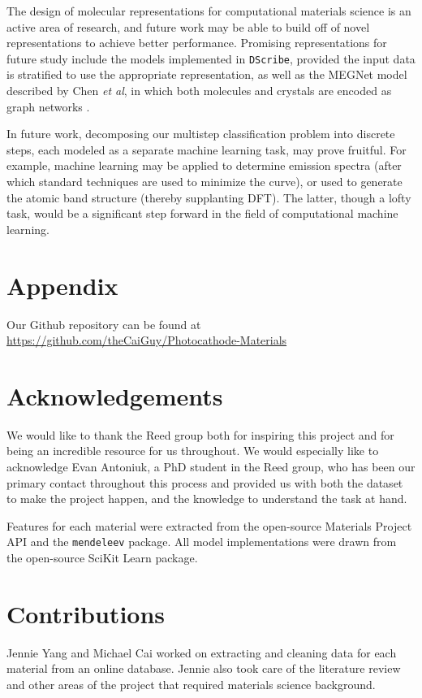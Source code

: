 \documentclass[10pt,twocolumn,letterpaper]{article}
\begin{document}
The design of molecular representations for computational materials science is an active area of research, and future work may be able to build off of novel representations to achieve better performance. Promising representations for future study include the models implemented in \texttt{DScribe}, provided the input data is stratified to use the appropriate representation, as well as the MEGNet model described by Chen \textit{et al}, in which both molecules and crystals are encoded as graph networks \cite{MEGNet}.

In future work, decomposing our multistep classification problem into discrete steps, each modeled as a separate machine learning task, may prove fruitful. For example, machine learning may be applied to determine emission spectra (after which standard techniques are used to minimize the curve), or used to generate the atomic band structure (thereby supplanting DFT). The latter, though a lofty task, would be a significant step forward in the field of computational machine learning.

\section{Appendix}

Our Github repository can be found at \url{https://github.com/theCaiGuy/Photocathode-Materials}

\section{Acknowledgements}
We would like to thank the Reed group both for inspiring this project and for being an incredible resource for us throughout. We would especially like to acknowledge Evan Antoniuk, a PhD student in the Reed group, who has been our primary contact throughout this process and provided us with both the dataset to make the project happen, and the knowledge to understand the task at hand.

Features for each material were extracted from the open-source Materials Project API and the \texttt{mendeleev} package. All model implementations were drawn from the open-source SciKit Learn package.


\section{Contributions}
Jennie Yang and Michael Cai worked on extracting and cleaning data for each material from an online database. Jennie also took care of the literature review and other areas of the project that required materials science background.
\end{document}

